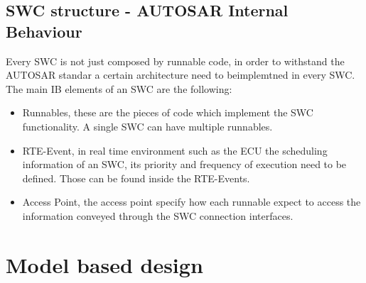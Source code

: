 \documentclass[../main.tex]{subfiles}
\begin{document}
\subsection{SWC structure - AUTOSAR Internal Behaviour}
Every SWC is not just composed by runnable code, in order to withstand the AUTOSAR standar a certain architecture need to beimplemtned in every SWC. The main IB elements of an SWC are the following:
\begin{itemize}
    \item Runnables, these are the pieces of code which implement the SWC functionality. A single SWC can have multiple runnables. 
    \item RTE-Event, in real time environment such as the ECU the scheduling information of an SWC, its priority and frequency of execution need to be defined. Those can be found inside the RTE-Events. 
    \item Access Point, the access point specify how each runnable expect to access the information conveyed through the SWC connection interfaces. 
\end{itemize}


\section{Model based design}
\end{document}
